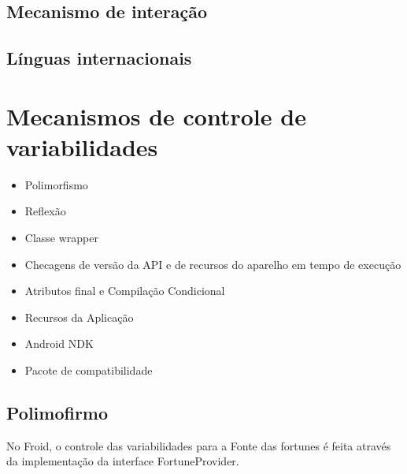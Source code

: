 \subsection{Mecanismo de interação}


\subsection{Línguas internacionais}


\section{Mecanismos de controle de variabilidades}
\begin{itemize}
    \item Polimorfismo
    \item Reflexão
    \item Classe wrapper
    \item Checagens de versão da API e de recursos do aparelho em tempo de execução
    \item Atributos final e Compilação Condicional 
    \item Recursos da Aplicação
    \item Android NDK
    \item Pacote de compatibilidade
\end{itemize}

\subsection{Polimofirmo}
No Froid, o controle das variabilidades para a Fonte das fortunes é feita através 
da implementação da interface FortuneProvider.

